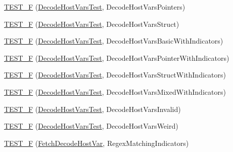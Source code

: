\begin{DoxyCompactItemize}
\hyperlink{namespaceclang_1_1tidy_1_1pagesjaunes_1_1test_a54aa96058cd21d48458c5b07b5d256f6}{T\+E\+S\+T\+\_\+F} (\hyperlink{classclang_1_1tidy_1_1pagesjaunes_1_1test_1_1_decode_host_vars_test}{Decode\+Host\+Vars\+Test}, Decode\+Host\+Vars\+Pointers)
\item 
\hyperlink{namespaceclang_1_1tidy_1_1pagesjaunes_1_1test_ad227042216e1a35a4bc01881f7b764a5}{T\+E\+S\+T\+\_\+F} (\hyperlink{classclang_1_1tidy_1_1pagesjaunes_1_1test_1_1_decode_host_vars_test}{Decode\+Host\+Vars\+Test}, Decode\+Host\+Vars\+Struct)
\item 
\hyperlink{namespaceclang_1_1tidy_1_1pagesjaunes_1_1test_a4152664c7bb07378827d7cb3d4863daf}{T\+E\+S\+T\+\_\+F} (\hyperlink{classclang_1_1tidy_1_1pagesjaunes_1_1test_1_1_decode_host_vars_test}{Decode\+Host\+Vars\+Test}, Decode\+Host\+Vars\+Basic\+With\+Indicators)
\item 
\hyperlink{namespaceclang_1_1tidy_1_1pagesjaunes_1_1test_a46ed8bf461236effdb50a1b3fcdd9076}{T\+E\+S\+T\+\_\+F} (\hyperlink{classclang_1_1tidy_1_1pagesjaunes_1_1test_1_1_decode_host_vars_test}{Decode\+Host\+Vars\+Test}, Decode\+Host\+Vars\+Pointer\+With\+Indicators)
\item 
\hyperlink{namespaceclang_1_1tidy_1_1pagesjaunes_1_1test_a33236157fda3ec5efa2bd2519a725255}{T\+E\+S\+T\+\_\+F} (\hyperlink{classclang_1_1tidy_1_1pagesjaunes_1_1test_1_1_decode_host_vars_test}{Decode\+Host\+Vars\+Test}, Decode\+Host\+Vars\+Struct\+With\+Indicators)
\item 
\hyperlink{namespaceclang_1_1tidy_1_1pagesjaunes_1_1test_ab378b25f1d62bda9ba744b08b654e7c5}{T\+E\+S\+T\+\_\+F} (\hyperlink{classclang_1_1tidy_1_1pagesjaunes_1_1test_1_1_decode_host_vars_test}{Decode\+Host\+Vars\+Test}, Decode\+Host\+Vars\+Mixed\+With\+Indicators)
\item 
\hyperlink{namespaceclang_1_1tidy_1_1pagesjaunes_1_1test_ad70912e713fc4ccf969b680167a14ded}{T\+E\+S\+T\+\_\+F} (\hyperlink{classclang_1_1tidy_1_1pagesjaunes_1_1test_1_1_decode_host_vars_test}{Decode\+Host\+Vars\+Test}, Decode\+Host\+Vars\+Invalid)
\item 
\hyperlink{namespaceclang_1_1tidy_1_1pagesjaunes_1_1test_a12a6c11bb1f8cc70dd3a3a78bfc41dd6}{T\+E\+S\+T\+\_\+F} (\hyperlink{classclang_1_1tidy_1_1pagesjaunes_1_1test_1_1_decode_host_vars_test}{Decode\+Host\+Vars\+Test}, Decode\+Host\+Vars\+Weird)
\item 
\hyperlink{namespaceclang_1_1tidy_1_1pagesjaunes_1_1test_aa06fc088c3ba5f8b86254ed10d643a32}{T\+E\+S\+T\+\_\+F} (\hyperlink{classclang_1_1tidy_1_1pagesjaunes_1_1test_1_1_fetch_decode_host_var}{Fetch\+Decode\+Host\+Var}, Regex\+Matching\+Indicators)

\end{DoxyCompactItemize}
